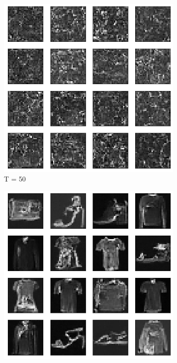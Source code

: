 \documentclass{article}
\begin{document}
\begin{figure}[H]
	\begin{subfigure}[h]{0.3\linewidth}
		\centering
		\includegraphics[scale=0.3]{../code/figures/generated_DDPM_50.png}
		\caption{T = 50}
	\end{subfigure}
	\hfill
	\begin{subfigure}[h]{0.3\linewidth}
		\centering
		\includegraphics[scale=0.3]{../code/figures/generated_DDPM_300.png}

\end{subfigure}
\end{figure}
\end{document}
